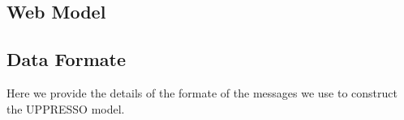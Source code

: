 
\begin{appendices}

\renewcommand{\algorithmicrequire}{\textbf{Input:}}
\newcommand{\deflet}{\textbf{let}}
\newcommand{\mystate}[1]{\STATE \textbf{let} {{}#1}}
\newcommand{\mystop}[1]{\STATE \textbf{stop} \myss{\myangle{{{}#1}}, s'}}
\newcommand{\myss}[1]{${{}#1}$}
\newcommand{\myangle}[1]{\langle {{}#1} \rangle}
\newcommand{\myif}[1]{\IF{\myss{{{}#1}}}}
\newcommand{\myelse}[1]{\ELSIF{\myss{{{}#1}}}}

\newcommand{\SWITCH}[1]{\STATE \textbf{switch} #1\ \textbf{do} \begin{ALC@g}}
\newcommand{\ENDSWITCH}{\end{ALC@g}\STATE \textbf{end switch}}
\newcommand{\CASE}[1]{\STATE \textbf{case} #1\textbf{:} \begin{ALC@g}}
\newcommand{\ENDCASE}{\end{ALC@g}}
\newcommand{\CASELINE}[1]{\STATE \textbf{case} #1\textbf{:} }
\newcommand{\DEFAULT}{\STATE \textbf{default:} \begin{ALC@g}}
\newcommand{\ENDDEFAULT}{\end{ALC@g}}
\newcommand{\DEFAULTLINE}[1]{\STATE \textbf{default:} }

\section{Web Model}
\label{ape:model}

\subsection{Data Formate}
Here we provide the details of the formate of the messages we use to construct the UPPRESSO model.


\end{appendices}
